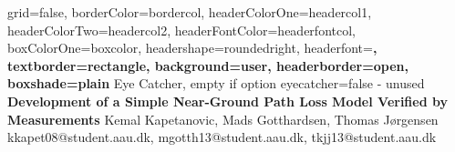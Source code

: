 \documentclass[a0paper,landscape]{baposter}
\begin{document}

\background{
}

\begin{poster}{
	grid=false,
	borderColor=bordercol,
	headerColorOne=headercol1,
	headerColorTwo=headercol2,
	headerFontColor=headerfontcol,
	boxColorOne=boxcolor,
	headershape=roundedright,
	headerfont=\Large\sf\bf,
	textborder=rectangle,
	background=user,
	headerborder=open,
  boxshade=plain
}
{
	Eye Catcher, empty if option eyecatcher=false - unused
}
{\sf\bf
	Development of a Simple Near-Ground Path Loss Model Verified by Measurements
}
{
	\vspace{1em} Kemal Kapetanovic, Mads Gotthardsen, Thomas Jørgensen\\
	{\smaller kkapet08@student.aau.dk, mgotth13@student.aau.dk, tkjj13@student.aau.dk}
}
{
\setlength\fboxsep{0pt}
\setlength\fboxrule{0.5pt}
	}
\end{poster}
\end{document}
